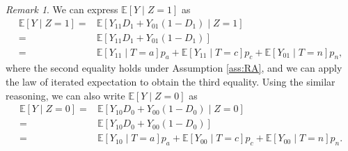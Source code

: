 \documentclass[12pt]{article}
\theoremstyle{plain}
\theoremstyle{definition}
\theoremstyle{remark}
\newtheorem{remark}{Remark}%
\begin{document}


\begin{remark}
We can express $\mathbb{E}[Y \mid Z = 1]$ as 
\begin{equation*}
    \begin{aligned}
        \mathbb{E}[Y \mid Z = 1] =& \mathbb{E}[Y_{11} D_1 + Y_{01} (1 - D_1) \mid Z = 1] \\
        =& \mathbb{E}[Y_{11} D_1 + Y_{01} (1 - D_1)] \\
        =& \mathbb{E}[Y_{11} \mid T = a] p_a + \mathbb{E}[Y_{11} \mid T = c] p_c + \mathbb{E}[Y_{01} \mid T = n] p_n,
    \end{aligned}
\end{equation*}
where the second equality holds under Assumption \ref{ass:RA}, and we can apply the law of iterated expectation to obtain the third equality. Using the similar reasoning, we can also write $\mathbb{E}\left[Y \mid Z = 0\right]$ as
\begin{equation*}
    \begin{aligned}
        \mathbb{E}[Y \mid Z = 0] =& \mathbb{E}[Y_{10} D_0 + Y_{00} (1 - D_0) \mid Z = 0] \\
        =& \mathbb{E}[Y_{10} D_0 + Y_{00} (1 - D_0)] \\
        =& \mathbb{E}[Y_{10} \mid T = a] p_a + \mathbb{E}[Y_{00} \mid T = c] p_c + \mathbb{E}[Y_{00} \mid T = n] p_n.
    \end{aligned}
\end{equation*}


\end{remark}
\end{document}
